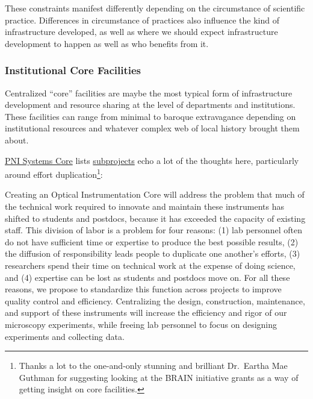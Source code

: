 \documentclass[10pt]{article}
\begin{document}
\begin{multicols}{2}
 These constraints manifest differently depending on the
circumstance of scientific practice. Differences in circumstance of
practices also influence the kind of infrastructure developed, as well
as where we should expect infrastructure development to happen as well
as who benefits from it.

\hypertarget{institutional-core-facilities}{%
\subsubsection{Institutional Core
Facilities}\label{institutional-core-facilities}}

Centralized ``core'' facilities are maybe the most typical form of
infrastructure development and resource sharing at the level of
departments and institutions. These facilities can range from minimal to
baroque extravagance depending on institutional resources and whatever
complex web of local history brought them about.

\href{https://projectreporter.nih.gov/project_info_details.cfm?aid=9444124}{PNI
Systems Core} lists
\href{https://projectreporter.nih.gov/project_info_subprojects.cfm?aid=9444124\&icde=0}{subprojects}
echo a lot of the thoughts here, particularly around effort
duplication\footnote{Thanks a lot to the one-and-only stunning and
  brilliant Dr.~Eartha Mae Guthman for suggesting looking at the BRAIN
  initiative grants as a way of getting insight on core facilities.}:

\begin{leftbar}
Creating an Optical Instrumentation Core will address the problem that
much of the technical work required to innovate and maintain these
instruments has shifted to students and postdocs, because it has
exceeded the capacity of existing staff. This division of labor is a
problem for four reasons: (1) lab personnel often do not have sufficient
time or expertise to produce the best possible results, (2) the
diffusion of responsibility leads people to duplicate one another's
efforts, (3) researchers spend their time on technical work at the
expense of doing science, and (4) expertise can be lost as students and
postdocs move on. For all these reasons, we propose to standardize this
function across projects to improve quality control and efficiency.
Centralizing the design, construction, maintenance, and support of these
instruments will increase the efficiency and rigor of our microscopy
experiments, while freeing lab personnel to focus on designing
experiments and collecting data.
\end{leftbar}


\end{multicols}
\end{document}
